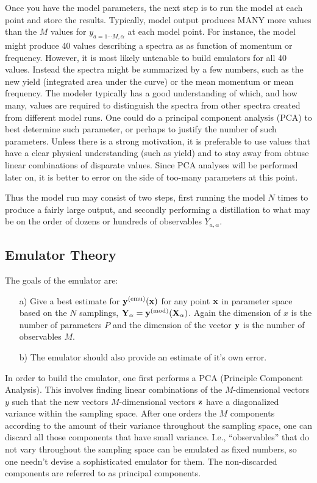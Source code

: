 Once you have the model parameters, the next step is to run the model at each point and store the results. Typically, model output produces MANY more values than the $M$ values for $y_{a=1\cdots M,\alpha}$ at each model point. For instance, the model might produce 40 values describing a spectra as as function of momentum or frequency. However, it is most likely untenable to build emulators for all 40 values. Instead the spectra might be summarized by a few numbers, such as the new yield (integrated area under the curve) or the mean momentum or mean frequency. The modeler typically has a good understanding of which, and how many, values are required to distinguish the spectra from other spectra created from different model runs. One could do a principal component analysis (PCA) to best determine such parameter, or perhaps to justify the number of such parameters. Unless there is a strong motivation, it is preferable to use values that have a clear physical understanding (such as yield) and to stay away from obtuse linear combinations of disparate values. Since PCA analyses will be performed later on, it is better to error on the side of too-many parameters at this point.

Thus the model run may consist of two steps, first running the model $N$ times to produce a fairly large output, and secondly performing a distillation to what may be on the order of dozens or hundreds of observables $Y_{a,\alpha}$.

\subsection{Emulator Theory}

The goals of the emulator are:
\begin{itemize}
\item[a)] Give a best estimate for ${\bf y}^{(\rm emu)}({\bf x})$ for any point ${\bf x}$ in parameter space based on the $N$ samplings, ${\bf Y}_\alpha={\bf y}^{\rm(mod)}({\bf X}_\alpha)$. Again the dimension of $x$ is the number of parameters $P$ and the dimension of the vector ${\bf y}$ is the number of observables $M$.
\item[b)] The emulator should also provide an estimate of it's own error.
\end{itemize}

In order to build the emulator, one first performs a PCA (Principle Component Analysis). This involves finding linear combinations of the $M$-dimensional vectors $y$ such that the new vectors $M$-dimensional vectors ${\bf z}$ have a diagonalized variance within the sampling space. After one orders the $M$ components according to the amount of their variance throughout the sampling space, one can discard all those components that have small variance. I.e., ``observables'' that do not vary throughout the sampling space can be emulated as fixed numbers, so one needn't devise a sophisticated emulator for them. The non-discarded components are referred to as principal components.

